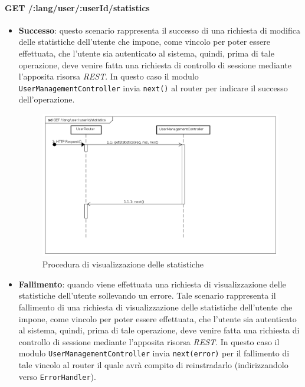 \paragraph{GET /:lang/user/:userId/statistics}
\begin{itemize}
\item \textbf{Successo}: questo scenario rappresenta il successo di una richiesta di modifica delle statistiche  dell'utente che impone, come vincolo per poter essere effettuata, che l'utente sia autenticato al sistema, quindi, prima di tale operazione, deve venire fatta una richiesta di controllo di sessione mediante l'apposita risorsa \textit{REST}.  
In questo caso il modulo \texttt{UserManagementController} invia \texttt{next()} al router per indicare il successo dell'operazione.

\label{Procedura di visualizzazione delle statistiche}
\begin{figure}[ht]
	\centering
	\includegraphics[scale=0.40]{UML/DiagrammiDiSequenza/Back-end/GET_LangUserUserIdStatisticsSuccess.png}
	\caption{Procedura di visualizzazione delle statistiche}
\end{figure}
\FloatBarrier
\item \textbf{Fallimento}: quando viene effettuata una richiesta di visualizzazione delle statistiche dell'utente sollevando un errore. Tale scenario rappresenta il fallimento di una richiesta di visualizzazione delle statistiche dell'utente che impone, come vincolo per poter essere effettuata, che l'utente sia autenticato al sistema, quindi, prima di tale operazione, deve venire fatta una richiesta di controllo di sessione mediante l'apposita risorsa \textit{REST}. In questo caso il modulo \texttt{UserManagementController} invia \texttt{next(error)} per il fallimento di tale vincolo al router il quale avrà compito di reinstradarlo (indirizzandolo verso \texttt{ErrorHandler}).


\end{itemize}
